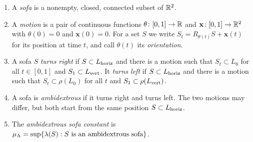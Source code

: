 \begin{defn}\label{def:sofa}
\leavevmode
\begin{enumerate}[label=(\alph*)]
\item A \emph{sofa} is a nonempty, closed, connected subset of $\mathbb{R}^2$.
\item A \emph{motion} is a pair of continuous functions $\theta\colon[0,1]\to\mathbb{R}$ and $\mathbf{x}\colon[0,1]\to\mathbb{R}^2$ with $\theta(0)=0$ and $\mathbf{x}(0)=0$. For a set $S$ we write $S_t=R_{\theta(t)}S+\mathbf{x}(t)$ for its position at time $t$, and call $\theta(t)$ its \emph{orientation}.
\item A sofa $S$ \emph{turns right} if $S\subset L_{\mathrm{horiz}}$ and there is a motion such that $S_t\subset L_0$ for all $t\in[0,1]$ and $S_1\subset L_{\mathrm{vert}}$. It \emph{turns left} if $S\subset L_{\mathrm{horiz}}$ and there is a motion such that $S_t\subset\rho(L_0)$ for all $t$ and $S_1\subset\rho(L_{\mathrm{vert}})$.
\item A sofa is \emph{ambidextrous} if it turns right and turns left. The two motions may differ, but both start from the same position $S\subset L_{\mathrm{horiz}}$.
\item The \emph{ambidextrous sofa constant} is $\mu_{\mathrm{A}}=\sup\{\lambda(S): S \text{ is an ambidextrous sofa}\}$.
\end{enumerate}
\end{defn}

